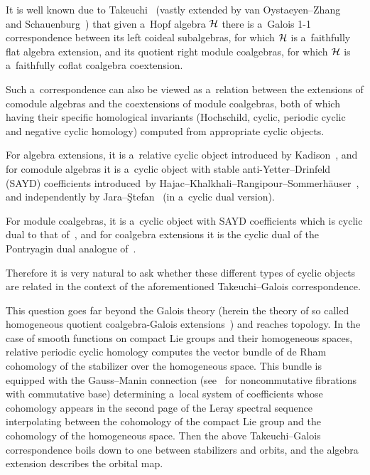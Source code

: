 \documentclass[pdftex]{sigma}
\numberwithin{equation}{section}
\begin{document}
It is well known due to Takeuchi~\cite{Take72} (vastly extended by van Oystaeyen--Zhang~\cite{VanOZhan94} and
Schauenburg~\cite{Scha98-II}) that given a~Hopf algebra ${\cal H}$ there is a~Galois 1-1 correspondence between its left
coideal subalgebras, for which ${\cal H}$ is a~faithfully f\/lat algebra extension, and its quotient right module
coalgebras, for which ${\cal H}$ is a~faithfully cof\/lat coalgebra coextension.

Such a~correspondence can also be viewed as a~relation between the extensions of comodule algebras and the coextensions
of module coalgebras, both of which having their specif\/ic homological invariants (Hochschild, cyclic, periodic cyclic
and negative cyclic homology) computed from appropriate cyclic objects.

For algebra extensions, it is a~relative cyclic object introduced by Kadison~\cite{Kadi89}, and for comodule algebras it
is a~cyclic object with stable anti-Yetter--Drinfeld (SAYD) coef\/f\/icients introduced~by
Hajac--Khalkhali--Rangipour--Sommerh\"{a}user~\cite{HajaKhalRangSomm04-II,HajaKhalRangSomm04-I}, and independently by
Jara--\c{S}tefan~\cite{JaraStef06} (in a~cyclic dual version).

For module coalgebras, it is a~cyclic object with SAYD coef\/f\/icients which is cyclic dual to that
of~\cite{HajaKhalRangSomm04-II}, and for coalgebra extensions it is the cyclic dual of the Pontryagin dual analogue
of~\cite{Kadi89}.

Therefore it is very natural to ask whether these dif\/ferent types of cyclic objects are related in the context of the
aforementioned Takeuchi--Galois correspondence.

This question goes far beyond the Galois theory (herein the theory of so called homogeneous quotient coalgebra-Galois
extensions~\cite{BrzeHaja09}) and reaches topology.
In the case of smooth functions on compact Lie groups and their homogeneous spaces, relative periodic cyclic homology
computes the vector bundle of de Rham cohomology of the stabilizer over the homogeneous space.
This bundle is equipped with the Gauss--Manin connection (see~\cite{Getz91-92} for noncommutative f\/ibrations with
commutative base) determining a~local system of coef\/f\/icients whose cohomology appears in the second page of the Leray
spectral sequence interpolating between the cohomology of the compact Lie group and the cohomology of the homogeneous space.
Then the above Takeuchi--Galois correspondence boils down to one between stabilizers and orbits, and the algebra
extension describes the orbital map.
\end{document}

